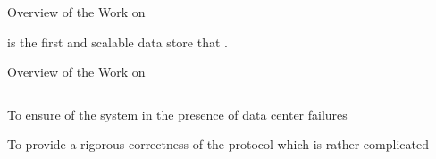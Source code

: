 
\begin{frame}{Overview of the Work on \unistore}
  \begin{center}
    \vspace{0.20cm}

    \vspace{1.00cm}
    \unistore{} is the first  and scalable  data store
    that .
  \end{center}
\end{frame}

\begin{frame}{Overview of the Work on \unistore}
  \begin{center}


    \begin{columns}
      \begin{description}[Challenges (II):]
        \setlength{\itemsep}{15pt}
        \item[Challenges (I):] To ensure  of the system in the presence of data
          center failures \pause
        \item[Challenges (II):] To provide a rigorous correctness  of the protocol
          which is rather complicated
      \end{description}
    \end{columns}
  \end{center}
\end{frame}

